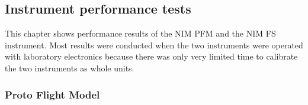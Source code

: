 	

		
	\subsection{Instrument performance tests}
		This chapter shows performance results of the NIM PFM and the NIM FS instrument. Most results were conducted when the two instruments were operated with laboratory electronics because there was only very limited time to calibrate the two instruments as whole units.
		
		\subsubsection{Proto Flight Model}\label{sec:paper}
		\clearpage
		\newpage
		\thispagestyle{empty}
		\null
		\newpage
		
		
		\newpage
		
